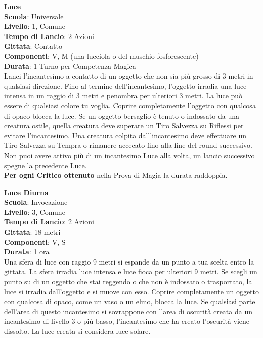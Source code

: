 \begin{multicols}{2}
\medskip\textbf{Luce}\\
\textbf{Scuola}: Universale\\
\textbf{Livello}: 1, Comune\\
\textbf{Tempo di Lancio}: 2 Azioni\\
\textbf{Gittata}: Contatto\\
\textbf{Componenti}: V, M (una lucciola o del muschio fosforescente)\\
\textbf{Durata}: 1 Turno per Competenza Magica\\
Lanci l'incantesimo a contatto di un oggetto che non sia più grosso di 3 metri in qualsiasi direzione. Fino al termine dell'incantesimo, l'oggetto irradia una luce intensa in un raggio di 3 metri e penombra per ulteriori 3 metri. La luce può essere di qualsiasi colore tu voglia. Coprire completamente l'oggetto con qualcosa di opaco blocca la luce. Se un oggetto bersaglio è tenuto o indossato da una creatura ostile, quella creatura deve superare un Tiro Salvezza su Riflessi per evitare l'incantesimo. Una creatura colpita dall'incantesimo deve effettuare un Tiro Salvezza su Tempra o rimanere accecato fino alla fine del round successivo. Non puoi avere attivo più di un incantesimo Luce alla volta, un lancio successivo spegne la precedente Luce.\\
\textbf{Per ogni Critico ottenuto} nella Prova di Magia la durata raddoppia.

\medskip\textbf{Luce Diurna}\\
\textbf{Scuola}: Invocazione\\
\textbf{Livello}: 3, Comune\\
\textbf{Tempo di Lancio}: 2 Azioni\\
\textbf{Gittata}: 18 metri\\
\textbf{Componenti}: V, S\\
\textbf{Durata}: 1 ora\\
Una sfera di luce con raggio 9 metri si espande da un punto a tua scelta entro la gittata. La sfera irradia luce intensa e luce fioca per ulteriori 9 metri. Se scegli un punto su di un oggetto che stai reggendo o che non è indossato o trasportato, la luce si irradia dall'oggetto e si muove con esso. Coprire completamente un oggetto con qualcosa di opaco, come un vaso o un elmo, blocca la luce. Se qualsiasi parte dell'area di questo incantesimo si sovrappone con l'area di oscurità creata da un incantesimo di livello 3 o più basso, l'incantesimo che ha creato l'oscurità viene dissolto. La luce creata si considera luce solare.


\end{multicols}
